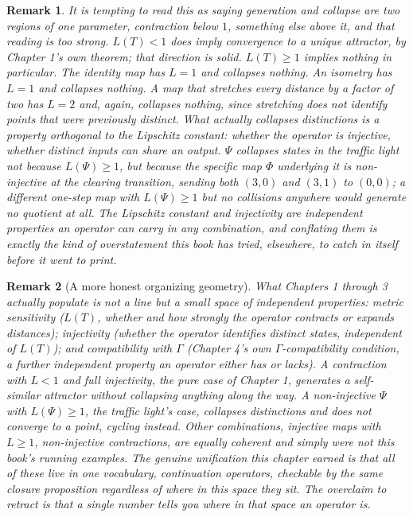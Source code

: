 \documentclass[11pt]{report}
\newtheorem{remark}{Remark}[chapter]
\begin{document}
\begin{remark}
It is tempting to read this as saying generation and collapse are two
regions of one parameter, contraction below $1$, something else
above it, and that reading is too strong. $L(T) < 1$ does imply
convergence to a unique attractor, by Chapter 1's own theorem; that
direction is solid. $L(T) \geq 1$ implies nothing in particular. The
identity map has $L=1$ and collapses nothing. An isometry has $L=1$
and collapses nothing. A map that stretches every distance by a
factor of two has $L=2$ and, again, collapses nothing, since
stretching does not identify points that were previously distinct.
What actually collapses distinctions is a property orthogonal to the
Lipschitz constant: whether the operator is injective, whether
distinct inputs can share an output. $\Psi$ collapses states in the
traffic light not because $L(\Psi) \geq 1$, but because the specific
map $\Phi$ underlying it is non-injective at the clearing transition,
sending both $(3,0)$ and $(3,1)$ to $(0,0)$; a different one-step map
with $L(\Psi) \geq 1$ but no collisions anywhere would generate no
quotient at all. The Lipschitz constant and injectivity are
independent properties an operator can carry in any combination, and
conflating them is exactly the kind of overstatement this book has
tried, elsewhere, to catch in itself before it went to print.
\end{remark}

\begin{remark}[A more honest organizing geometry]
What Chapters 1 through 3 actually populate is not a line but a small
space of independent properties: metric sensitivity ($L(T)$, whether
and how strongly the operator contracts or expands distances);
injectivity (whether the operator identifies distinct states,
independent of $L(T)$); and compatibility with $\Gamma$ (Chapter 4's
own $\Gamma$-compatibility condition, a further independent property
an operator either has or lacks). A contraction with $L<1$ and full
injectivity, the pure case of Chapter 1, generates a self-similar
attractor without collapsing anything along the way. A non-injective
$\Psi$ with $L(\Psi) \geq 1$, the traffic light's case, collapses
distinctions and does not converge to a point, cycling instead. Other
combinations, injective maps with $L \geq 1$, non-injective
contractions, are equally coherent and simply were not this book's
running examples. The genuine unification this chapter earned is that
all of these live in one vocabulary, continuation operators, checkable
by the same closure proposition regardless of where in this space
they sit. The overclaim to retract is that a single number tells you
where in that space an operator is.
\end{remark}
\end{document}
